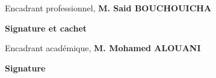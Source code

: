 \thispagestyle{empty}

\begin{center}
    \begin{minipage}[l]{1\columnwidth}
        \begin{tcolorbox}[colback=white,boxrule=5pt,arc=10pt,height=105mm]{
            \vspace{2cm}
            \large \@proSignSentence
            \vspace{1mm}
            \begin{center}
                \Large
                Encadrant professionnel, \textbf{M. Said BOUCHOUICHA}
            \end{center}
            \vspace{5mm}
            \hspace{0.71\columnwidth}\textbf{\large Signature et cachet}
        }
        \end{tcolorbox}
    \end{minipage}
    
    \vspace{2cm}
    
    \begin{minipage}[l]{1\columnwidth}
        \begin{tcolorbox}[colback=white,boxrule=5pt,arc=10pt,height=105mm]{
            \vspace{2cm}
            \large \@academicSignSentence
            \vspace{1mm}
            \begin{center}
                \Large
                Encadrant académique, \textbf{M. Mohamed ALOUANI}
            \end{center}
            \vspace{5mm}
            \hspace{0.84\columnwidth}\textbf{\large Signature}
        }
        \end{tcolorbox}
    \end{minipage}
\end{center}